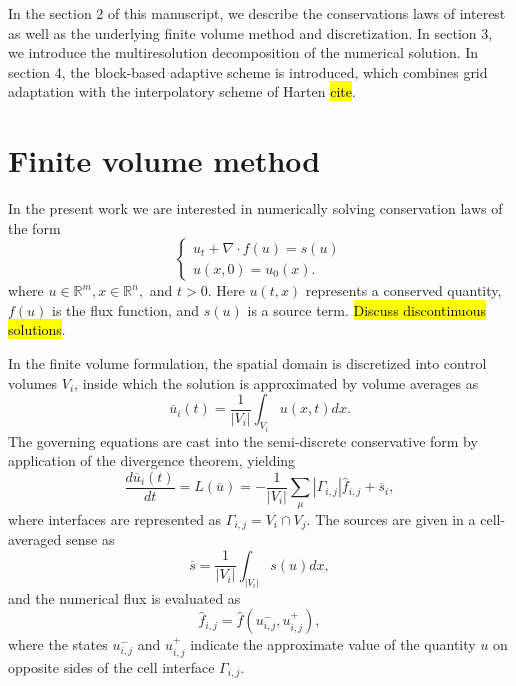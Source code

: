 \documentclass[]{article}
\begin{document}
    In the section 2 of this manuscript, we describe the conservations laws 
    of interest as well as the underlying finite volume
    method and discretization. In section 3, we introduce the multiresolution
    decomposition of the numerical solution. In section 4, the block-based
    adaptive scheme is introduced, which combines grid adaptation with the
    interpolatory scheme of Harten \hl{cite}.
    
\section{Finite volume method}

    In the present work we are interested in numerically solving conservation
    laws of the form
    \begin{equation}
    \begin{cases}
      u_{t} + \nabla \cdot f(u) = s(u) \\
      u(x,0) = u_{0}(x).
    \end{cases}
    \label{claw}
    \end{equation}
    where $u \in \mathbb{R}^{m}, x \in \mathbb{R}^{n},$ and $t > 0$. Here
    $u(t,x)$ represents a conserved quantity, $f(u)$ is the flux function, and
    $s(u)$ is a source term. \hl{Discuss discontinuous solutions}.
    
    In the finite volume formulation, the spatial domain is discretized into
    control volumes $V_{i}$, inside which the solution is approximated by volume
    averages as
    \begin{equation}
        \overline{u}_{i}(t) = \frac{1}{|V_{i}|} \int_{V_{i}} u(x,t) dx.
    \end{equation}
    The governing equations are cast into the semi-discrete conservative form
    by application of the divergence theorem, yielding
    \begin{equation}
        \frac{d \overline{u}_{i}(t)}{dt} = L(\overline{u}) =  -\frac{1}{|V_{i}|} \sum_{\mu} |
        \Gamma_{i,j}| \hat{f}_{i,j}
        + \overline{s}_{i},
        \label{ode}
    \end{equation}
    where interfaces are represented as $\Gamma_{i,j} = V_{i} \cap
    V_{j}$. The sources are given in a cell-averaged sense as
    \begin{equation}
        \overline{s} = \frac{1}{|V_{i}|} \int_{|V_{i}|} s(u) dx,
    \end{equation}
    and the numerical flux is evaluated as
    \begin{equation}
        \hat{f}_{i,j} = \hat{f}(u^{-}_{i,j}, u^{+}_{i,j}),
    \end{equation}
    where the states $u^{-}_{i,j}$ and $u^{+}_{i,j}$ indicate the approximate
    value of the quantity $u$ on opposite sides of the cell
    interface $\Gamma_{i,j}$.
    
\end{document}
